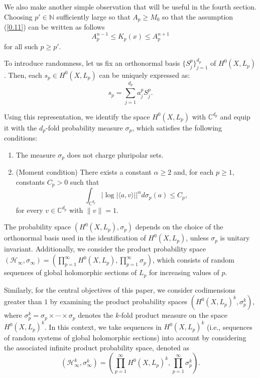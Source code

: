 \documentclass[11pt,leqno,oneside]{amsart}
\numberwithin{equation}{section}
\begin{document}
We also make another simple observation that will be useful in the fourth section. Choosing $p'\in\mathbb{N}$ sufficiently large so that $A_{p}\geq M_{0}$ so that the assumption (\ref{0.11}) can be written as follows \begin{equation}\label{m1.3} A_{p}^{n-1}\leq K_{p}(x)\leq A_{p}^{n+1}\end{equation} for all such $p \geq p'$.

To introduce randomness, let us fix an orthonormal basis \( \{S^{p}_{j}\}^{d_{p}}_{j=1} \) of \( H^{0}(X, L_{p}) \). Then, each \( s_{p} \in H^{0}(X, L_{p}) \) can be uniquely expressed as:
\begin{equation}\label{rep}
	s_{p} = \sum_{j=1}^{d_{p}}{a_{j}^{p} S^{p}_{j}}.
\end{equation}

Using this representation, we identify the space \( H^{0}(X, L_{p}) \) with \( \mathbb{C}^{d_{p}} \) and equip it with the \( d_{p} \)-fold probability measure \( \sigma_{p} \), which satisfies the following conditions:

\begin{enumerate}
	\item [\textbf{(C1)}] The measure \( \sigma_{p} \) does not charge pluripolar sets.
	\item [\textbf{(C2)}] (Moment condition) There exists a constant \( \alpha \geq 2 \) and, for each \( p \geq 1 \), constants \( C_{p} > 0 \) such that
	$$
	\int_{\mathbb{C}^{d_{p}}} \big| \log |\langle a, v \rangle| \big|^{\alpha} d\sigma_{p}(a) \leq C_{p},
	$$
	for every \( v \in \mathbb{C}^{d_{p}} \) with \( \|v\| = 1 \).
\end{enumerate}




The probability space \( (H^{0}(X, L_{p}), \sigma_{p}) \) depends on the choice of the orthonormal basis used in the identification of \( H^{0}(X, L_{p}) \), unless \( \sigma_{p} \) is unitary invariant. Additionally, we consider the product probability space \( (\mathcal{H}_{\infty}, \sigma_{\infty}) = \left(\prod_{p=1}^{\infty} H^{0}(X, L_{p}), \prod_{p=1}^{\infty} \sigma_{p}\right) \), which consists of random sequences of global holomorphic sections of \( L_{p} \) for increasing values of \( p \).

Similarly, for the central objectives of this paper, we consider codimensions greater than $1$ by examining the product probability spaces $(H^{0}(X, L_{p})^{k}, \sigma_{p}^{k})$, where $\sigma_{p}^{k} = \sigma_{p} \times \cdots \times \sigma_{p}$ denotes the $k$-fold product measure on the space $H^{0}(X, L_{p})^{k}$. In this context, we take sequences in $H^{0}(X, L_{p})^{k}$ (i.e., sequences of random systems of global holomorphic sections) into account by considering the associated infinite product probability space, denoted as
 $$(\mathcal{H}^{k}_{\infty}, \sigma^{k}_{\infty}) = \left(\prod_{p=1}^{\infty} H^{0}(X, L_{p})^{k}, \prod_{p=1}^{\infty} \sigma^{k}_{p}\right).$$
\end{document}
